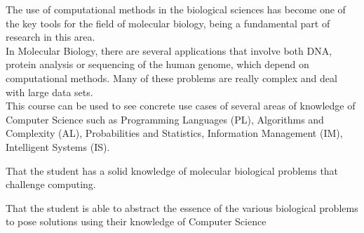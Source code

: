 \begin{syllabus}


\begin{justification}
The use of computational methods in the biological sciences has become one of the key tools for the field of molecular biology, being a fundamental part of research in this area.
\\
In Molecular Biology, there are several applications that involve both DNA, protein analysis or sequencing of the human genome, which depend on computational methods. Many of these problems are really complex and deal with large data sets.
\\
This course can be used to see concrete use cases of several areas of knowledge of Computer Science such as Programming Languages (PL), Algorithms and Complexity (AL), Probabilities and Statistics, Information Management (IM), Intelligent Systems (IS).
\end{justification}

\begin{goals}
\item That the student has a solid knowledge of molecular biological problems that challenge computing.
\item That the student is able to abstract the essence of the various biological problems to pose solutions using their knowledge of Computer Science
\end{goals}

\begin{outcomes}
    \item {}
    \item {}
    \item {}
\end{outcomes}

\begin{competences}
    \item {} 
    \item {}
    \item {}
\end{competences}


\end{syllabus}
